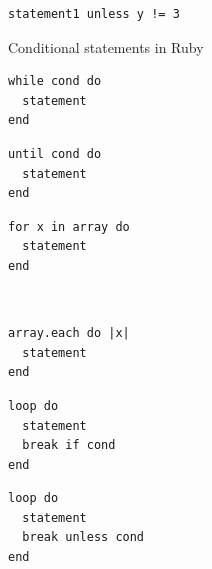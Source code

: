 \documentclass[12pt,a4paper,oneside,openright]{book}
\begin{document}
\begin{CJK}{UTF8}{}
\begin{figure}[htbp]
\begin{center}
    \begin{minipage}[c]{.3\textwidth}
      \begin{lstlisting}
statement1 unless y != 3
      \end{lstlisting}
    \end{minipage}
  \end{center}
  \caption{Conditional statements in Ruby~\citep{RefWorks:541}\label{fig:conditionals}}
\end{figure}
\begin{figure}[htbp]
  \lstset{language=Ruby,frame=single,numbers=none}
  \begin{center}
    \begin{minipage}[c]{.3\textwidth}
      \begin{lstlisting}
while cond do
  statement
end
      \end{lstlisting}
    \end{minipage}\hspace{1ex}
    \begin{minipage}[c]{.3\textwidth}
      \begin{lstlisting}
until cond do
  statement
end
      \end{lstlisting}
    \end{minipage}\hspace{1ex}
    \begin{minipage}[c]{.3\textwidth}
      \begin{lstlisting}
for x in array do
  statement
end
      \end{lstlisting}
    \end{minipage}\\
    \begin{minipage}[c]{.3\textwidth}
      \begin{lstlisting}
array.each do |x|
  statement
end
      \end{lstlisting}
    \end{minipage}\hspace{1ex}
    \begin{minipage}[c]{.3\textwidth}
      \begin{lstlisting}
loop do
  statement
  break if cond
end
      \end{lstlisting}
    \end{minipage}\hspace{1ex}
    \begin{minipage}[c]{.3\textwidth}
      \begin{lstlisting}
loop do
  statement
  break unless cond
end
      \end{lstlisting}

\end{minipage}
\end{center}
\end{figure}
\end{CJK}
\end{document}
